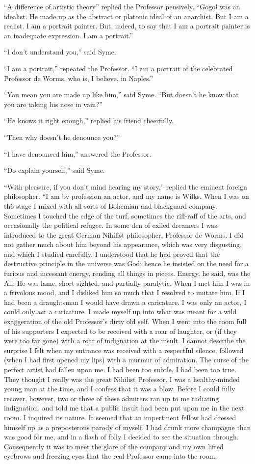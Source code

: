 \documentclass{book}
\begin{document}
“A difference of artistic theory” replied the Professor pensively. “Gogol was an idealist. He made up as the abstract or platonic ideal of an anarchist. But I am a realist. I am a portrait painter. But, indeed, to say that I am a portrait painter is an inadequate expression. I am a portrait.”

“I don’t understand you,” said Syme.

“I am a portrait,” repeated the Professor. “I am a portrait of the celebrated Professor de Worms, who is, I believe, in Naples.”

“You mean you are made up like him,” said Syme. “But doesn’t he know that you are taking his nose in vain?”

“He knows it right enough,” replied his friend cheerfully.

“Then why doesn’t he denounce you?”

“I have denounced him,” answered the Professor.

“Do explain yourself,” said Syme.

“With pleasure, if you don’t mind hearing my story,” replied the eminent foreign philosopher. “I am by profession an actor, and my name is Wilks. When I was on th6 stage I mixed with all sorts of Bohemian and blackguard company. Sometimes I touched the edge of the turf, sometimes the riff-raff of the arts, and occasionally the political refugee. In some den of exiled dreamers I was introduced to the great German Nihilist philosopher, Professor de Worms. I did not gather much about him beyond his appearance, which was very disgusting, and which I studied carefully. I understood that he had proved that the destructive principle in the universe was God; hence he insisted on the need for a furious and incessant energy, rending all things in pieces. Energy, he said, was the All. He was lame, short-sighted, and partially paralytic. When I met him I was in a frivolous mood, and I disliked him so much that I resolved to imitate him. If I had been a draughtsman I would have drawn a caricature. I was only an actor, I could only act a caricature. I made myself up into what was meant for a wild exaggeration of the old Professor’s dirty old self. When I went into the room full of his supporters I expected to be received with a roar of laughter, or (if they were too far gone) with a roar of indignation at the insult. I cannot describe the surprise I felt when my entrance was received with a respectful silence, followed (when I had first opened my lips) with a murmur of admiration. The curse of the perfect artist had fallen upon me. I had been too subtle, I had been too true. They thought I really was the great Nihilist Professor. I was a healthy-minded young man at the time, and I confess that it was a blow. Before I could fully recover, however, two or three of these admirers ran up to me radiating indignation, and told me that a public insult had been put upon me in the next room. I inquired its nature. It seemed that an impertinent fellow had dressed himself up as a preposterous parody of myself. I had drunk more champagne than was good for me, and in a flash of folly I decided to see the situation through. Consequently it was to meet the glare of the company and my own lifted eyebrows and freezing eyes that the real Professor came into the room.
\end{document}
